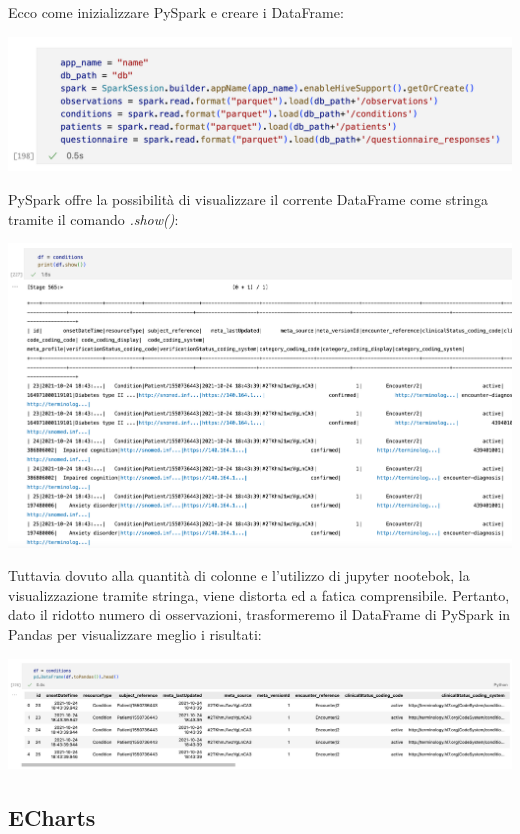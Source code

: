 \documentclass[11pt, oneside]{article}
\begin{document}
Ecco come inizializzare PySpark e creare i DataFrame:
\begin{center}
\includegraphics[scale=0.5]{1_init.png}
\end{center}

PySpark offre la possibilità di visualizzare il corrente DataFrame come stringa tramite il comando \emph{.show()}:

\begin{center}
\includegraphics[scale=0.5]{1_spark.png}
\end{center}

Tuttavia dovuto alla quantità di colonne e l'utilizzo di jupyter nootebok, la visualizzazione tramite stringa, viene distorta ed a fatica comprensibile. Pertanto, dato il ridotto numero di osservazioni, trasformeremo il DataFrame di PySpark in Pandas per visualizzare meglio i risultati:

\begin{center}
\includegraphics[scale=0.5]{1_pandas.png}
\end{center}


\subsection{ECharts}
\end{document}
